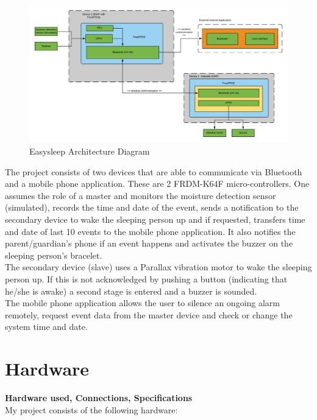 \documentclass[12pt,a4paper]{article}
\begin{document}
	\begin{figure}[h]
	 \centering
	 \includegraphics[width=\textwidth]{moistureDetectionArch.png}
	 \caption{Easysleep Architecture Diagram}
	 \label{fig:easysleepArchitectureDiagram}
	\end{figure}

	
	The project consists of two devices that are able to communicate via Bluetooth and a mobile phone application. These are 2 FRDM-K64F micro-controllers. One assumes the role of a master and 
	monitors the moisture detection sensor (simulated), records the time and date of the event, sends a notification to the secondary device to wake the sleeping person up and if requested, 
	transfers time and date of last 10 events to the mobile phone application. It also notifies the 
	parent/guardian's phone if an event happens and activates the buzzer on the sleeping 
	person's bracelet.\\
	
	The secondary device (slave) uses a Parallax vibration motor to wake the sleeping person up. 
	If this is not acknowledged by pushing a button (indicating that he/she is awake) a second stage is entered and a buzzer is sounded.\\
	
	The mobile phone application allows the user to silence an ongoing alarm remotely, request 
	event data from the master device and check or change the system time and date.\\
	\newpage
	
	\section{Hardware}
	{\bfseries Hardware used, Connections, Specifications}\\
	
	My project consists of the following hardware:
	
\end{document}
